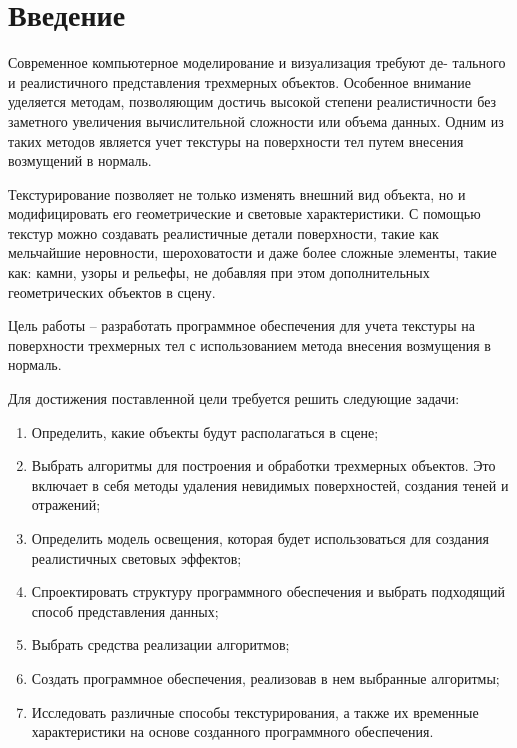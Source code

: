 	\chapter*{Введение}

Современное компьютерное моделирование и визуализация требуют де-
тального и реалистичного представления трехмерных объектов. Особенное внимание уделяется методам, позволяющим достичь высокой степени реалистичности без заметного увеличения вычислительной сложности или объема данных. Одним из таких методов является учет текстуры на поверхности тел путем внесения возмущений в нормаль.

Текстурирование позволяет не только изменять внешний вид объекта, но и модифицировать его геометрические и световые характеристики. С помощью текстур можно создавать реалистичные детали поверхности, такие как мельчайшие неровности, шероховатости и даже более сложные элементы, такие как: камни, узоры и рельефы, не добавляя при этом дополнительных геометрических объектов в сцену.

Цель работы – разработать программное обеспечения для учета текстуры на поверхности трехмерных тел с использованием метода внесения возмущения в нормаль.

Для достижения поставленной цели требуется решить следующие задачи:
\begin{enumerate}[label=\arabic*)]
    \item Определить, какие объекты будут располагаться в сцене;
    \item Выбрать алгоритмы для построения и обработки трехмерных объектов. Это включает в себя методы удаления невидимых поверхностей, создания теней и отражений;
    \item Определить модель освещения, которая будет использоваться для создания реалистичных световых эффектов;
    \item Спроектировать структуру программного обеспечения и выбрать подходящий способ представления данных;
    \item Выбрать средства реализации алгоритмов;
    \item Создать программное обеспечения, реализовав в нем выбранные алгоритмы;
    \item Исследовать различные способы текстурирования, а также их временные характеристики на основе созданного программного обеспечения.
\end{enumerate}
